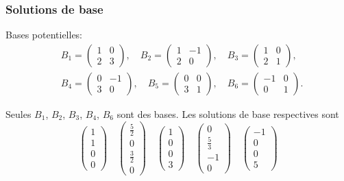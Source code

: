 \documentclass[usepdftitle=false]{beamer}
\begin{document}
\begin{frame}
\frametitle{Solutions de base}

Bases potentielles:
\begin{align*}
& B_1 = \begin{pmatrix} 1 & 0 \\ 2 & 3 \end{pmatrix}, \quad
B_2 = \begin{pmatrix} 1 & -1  \\ 2 & 0 \end{pmatrix}, \quad
B_3 = \begin{pmatrix} 1 & 0 \\ 2 & 1 \end{pmatrix}, \\
& B_4 = \begin{pmatrix} 0 & -1 \\ 3 & 0 \end{pmatrix}, \quad
B_5 = \begin{pmatrix} 0 & 0 \\ 3 & 1 \end{pmatrix}, \quad
B_6 = \begin{pmatrix} -1 & 0 \\ 0 & 1 \end{pmatrix}.
\end{align*}

Seules $B_1$, $B_2$, $B_3$, $B_4$, $B_6$ sont des bases. Les solutions de base respectives sont
$$
\begin{pmatrix}
1 \\ 1 \\ 0 \\ 0
\end{pmatrix}
\quad
\begin{pmatrix}
\frac{5}{2} \\ 0 \\ \frac{3}{2} \\ 0
\end{pmatrix}
\quad
\begin{pmatrix}
1 \\ 0 \\ 0 \\ 3
\end{pmatrix}
\quad
\begin{pmatrix}
0 \\ \frac{5}{3} \\ -1 \\ 0
\end{pmatrix}
\quad
\begin{pmatrix}
-1 \\ 0 \\ 0 \\ 5
\end{pmatrix}
$$

\end{frame}
\end{document}

